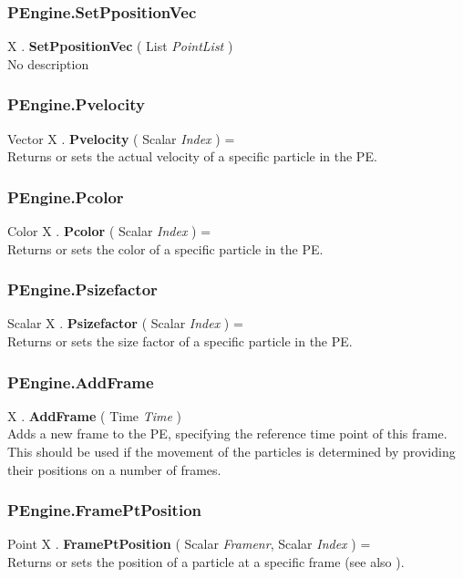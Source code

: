 \subsubsection{PEngine.SetPpositionVec \label{F:PEngine:SetPpositionVec}}
X . \textbf{SetPpositionVec} ( List \textit{PointList} ) \\
No description

\subsubsection{PEngine.Pvelocity \label{F:PEngine:Pvelocity}}
Vector X . \textbf{Pvelocity} ( Scalar \textit{Index} ) = \\
Returns or sets the actual velocity of a specific particle in the PE.

\subsubsection{PEngine.Pcolor \label{F:PEngine:Pcolor}}
Color X . \textbf{Pcolor} ( Scalar \textit{Index} ) = \\
Returns or sets the color of a specific particle in the PE.

\subsubsection{PEngine.Psizefactor \label{F:PEngine:Psizefactor}}
Scalar X . \textbf{Psizefactor} ( Scalar \textit{Index} ) = \\
Returns or sets the size factor of a specific particle in the PE.

\subsubsection{PEngine.AddFrame \label{F:PEngine:AddFrame}}
X . \textbf{AddFrame} ( Time \textit{Time} ) \\
Adds a new frame to the PE, specifying the reference time point of this frame. This should be used if the movement of the particles is determined by providing their positions on a number of frames.

\subsubsection{PEngine.FramePtPosition \label{F:PEngine:FramePtPosition}}
Point X . \textbf{FramePtPosition} ( Scalar \textit{Framenr}, Scalar \textit{Index} ) = \\
Returns or sets the position of a particle at a specific frame (see also ).

